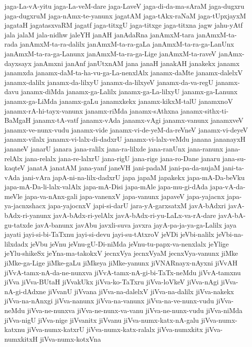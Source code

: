 {jaga-La-vA-yitu
jaga-La-veM-dare
jaga-LaveV
jaga-di-da-ma-sAraM
jaga-dugxru
jaga-dugxruM
jaga-nAmx-te-yanunx
jagatAM
jaga-tAkx-raNaM
jaga-tUpxjayxM
jagataH
jagatasxvaRM
jagatf
jaga-titxgU
jaga-titxge
jaga-titxna
jagw
jahu-yAtf
jala
jalaM
jala-nidhw
jaleYH
janAH
janAdaRna
janAmxM-tara
janAmxM-ta-rada
janAmxM-ta-ra-dalilx
janAmxM-ta-ra-gaLa
janAmxM-ta-ra-ga-LanUnx
janAmxM-ta-ra-ga-Lanunx
janAmxM-ta-ra-ga-Lige
janAmxM-ta-raveV
janAmx-dayxsayx
janAmxni
janAnf
janUtxnAM
jana
janaH
janakAH
janakekx
janamx
janamxda
janamx-daM-ta-ha-vu-ga-La-nenxlAlx
janamx-daMte
janamx-dalelxV
janamx-dalilx
janamx-da-lilxyU
janamx-da-lilxyeV
janamx-da-va-regU
janamx-davu
janamx-diMda
janamx-ga-Lalilx
janamx-ga-La-lilxyU
janamx-ga-Lanunx
janamx-ga-LiMda
janamx-gaLu
janamxkekx
janamx-kikxM-talU
janamxnoV
janamx-rA-hi-tayx-vanunx
janamx-riMda
janamx-sAthxna
janamx-sithx-ti-BaMgaH
janamx-tA-vatf
janamx-vAda
janamx-vAgi
janamx-vanunx
janamxveV
janamx-ve-nunx-vudu
janamx-vide
janamx-vi-de-yeM-da-reVneV
janamx-vi-deyeV
janamx-vilalx
janamx-vi-lalx-di-dadxrU
janamx-vi-lalx-veMdu
janana
jananayxH
jananeV
janarU
janara
jana-ralilx
jana-ra-lilxde
jana-ranUnx
jana-ranunx
jana-relAlx
jana-relalx
jana-re-lalxrU
jana-rigU
jana-rige
jana-ro-Dane
janaru
jana-su-kaqteV
janatA
janatAM
jana-yanf
janeVH
jani-padaM
jani-pa-da-nujaM
jani-ta-vAda
jani-vAra
japA-ni-na-lilx-dadxrU
japa
japaM
japakekx
japa-mA-Da-beVku
japa-mA-Da-li-lalx-valAlx
japa-mA-Disi
japa-mAle
japa-mu-gi-dAda
japa-vA-da-meVle
japa-va-nAnx-gali
japa-vanenxV
japa-vanunx
japaveV
japa-yajacnx
japa-ya-jacnxshacx
japa-yajocnxV
japi-si-darU
jara-yA-garxsatxM
javA-bAdxri
javA-bAdx-ri-yanunx
javA-bAdx-ri-yelAlx
javA-bAdx-ri-yu-LaLx-va-rA-dare
javA-bA-gu-tatxde
javA-banunx
javAbu
javxli-suva
javxra
jayA-pa-ja-ya-ga-Lalilx
jaya
jayati
jayi-si-bi-TaTxnu
jayi-si-devu
jayi-su-tAtxroV
jeVDi
jeVbi-nalilx
jeVbi-na-lilxdadx
jeVbu
jeVnu
jeVnu-gU-Di-niMda
jeVnu-tu-papx-va-nenxlalx
jeYlige
jeYlu-shikeSx
jeYna-ma-takokxV
jecnxVya
jecnxVyaM
jecnxVya-vanunx
jiMke
jiMke-ga-Lige
jiMke-gaLu
jiMkeya
jiMke-yanunx
jiVNARnayx-nAyxni
jiVvAH
jiVvA-tamx-nA-da-ne-nunxva
jiVvA-tamx-nA-gi-bi-TaTx-neMdu
jiVvA-tamxnu
jiVva
jiVva-BUtaH
jiVvakUkx
jiVva-ko-TaTxru
jiVva-loVkeV
jiVva-nAgi
jiVva-nA-gi-dAdxne
jiVvanU
jiVvana
jiVva-na-dalelxV
jiVva-na-dalilx
jiVva-nakekx
jiVva-na-nAnxgi
jiVva-nanunx
jiVva-na-vanunx
jiVva-na-ve-nunx-vudu
jiVva-neMdu
jiVva-ne-nunxva
jiVva-ne-nunx-va-vanu
jiVva-ne-nunx-vudu
jiVva-niMda
jiVva-nigU
jiVva-nige
jiVvanitx
jiVvanu
jiVva-numx-katx-nA-galu
jiVva-numx-katxnu
jiVva-numx-katxrU
jiVva-numx-katx-ralalx
jiVva-numxkitx
jiVva-numxkitxH
jiVva-numx-kotxVna
}

